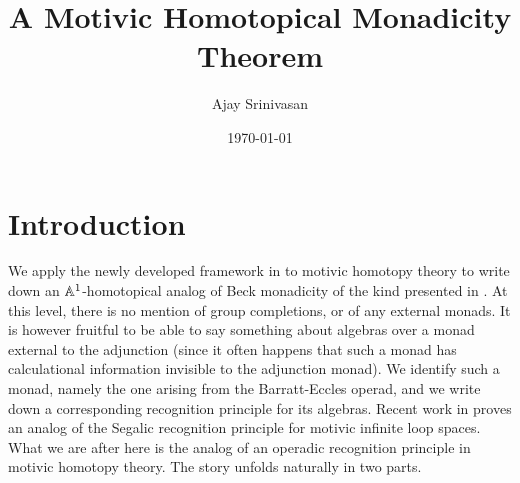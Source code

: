 \documentclass{amsart}
\title{A Motivic Homotopical Monadicity Theorem}
\author{Ajay Srinivasan}
\date{\today}
\theoremstyle{definition}
\begin{document}
\maketitle

\tableofcontents

\section*{Introduction}
We apply the newly developed framework in \cite{kong2024group} to motivic homotopy theory to write down an $\mathbb{A}^1$-homotopical analog of Beck monadicity of the kind presented in \cite{May09Einfty}. At this level, there is no mention of group completions, or of any external monads. It is however fruitful to be able to say something about algebras over a monad external to the adjunction (since it often happens that such a monad has calculational information invisible to the adjunction monad). We identify such a monad, namely the one arising from the Barratt-Eccles operad, and we write down a corresponding recognition principle for its algebras. Recent work in \cite{EHK21} proves an analog of the Segalic recognition principle for motivic infinite loop spaces. What we are after here is the analog of an operadic recognition principle in motivic homotopy theory. The story unfolds naturally in two parts.\\
\end{document}
